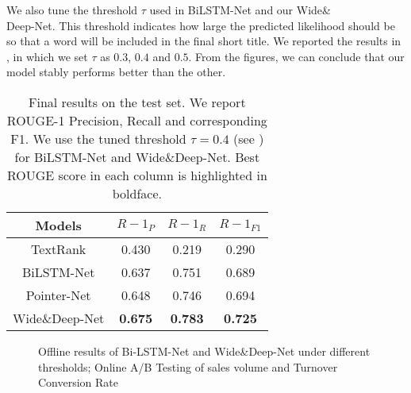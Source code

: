 We also tune the threshold $\tau$ used in BiLSTM-Net and our Wide\&\\Deep-Net.
This threshold indicates how large the predicted likelihood should be
so that a word will be included in the final short title.
We reported the results in ,
in which we set $\tau$ as $0.3$, $0.4$ and $0.5$.
From the figures, we can conclude that our model stably performs better than
the other.

\begin{table}[htbp]
\centering
\caption{
	Final results on the test set.
	We report ROUGE-1 Precision, Recall and corresponding F1.
	We use the tuned threshold $\tau=0.4$ (see ) for BiLSTM-Net and Wide\&Deep-Net.
	Best ROUGE score in each column is highlighted in boldface.
}
\label{tab:eval1}
\begin{tabular}{c|ccc}
	\toprule
	Models & $R-1_{P}$ & $R-1_{R}$ & $R-1_{F1}$ \\
	\midrule
	TextRank & 0.430 & 0.219 & 0.290 \\
	BiLSTM-Net & 0.637 & 0.751 & 0.689 \\
	Pointer-Net & 0.648  & 0.746 & 0.694 \\
	Wide\&Deep-Net & \textbf{0.675} & \textbf{0.783} & \textbf{0.725} \\
	\bottomrule
\end{tabular}
\end{table}

\begin{figure*}[th]
	\centering
	\caption{Offline results of Bi-LSTM-Net and Wide\&Deep-Net under different thresholds;
	Online A/B Testing of sales volume and 
	Turnover Conversion Rate}
	\label{fig:eval}
\end{figure*}



